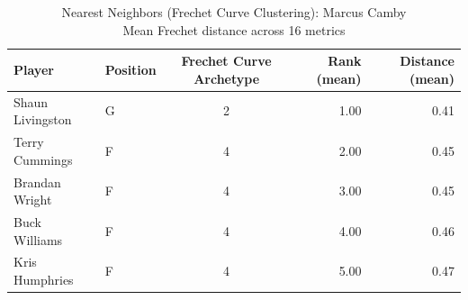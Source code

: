 \begin{table}[t]
\caption*{
{\fontsize{20}{25} Nearest Neighbors (Frechet Curve Clustering): Marcus Camby\fontsize{12}{15}\selectfont } \\ 
{\fontsize{14}{17}\selectfont  Mean Frechet distance across 16 metrics\fontsize{12}{15}\selectfont }
} 
\fontsize{12.0pt}{14.0pt}\selectfont
\begin{tabular*}{\linewidth}{@{\extracolsep{\fill}}llcrr}
\toprule
Player & Position & Frechet Curve Archetype & Rank (mean) & Distance (mean) \\ 
\midrule\addlinespace[2.5pt]
Shaun Livingston & G & 2 & 1.00 & 0.41 \\ 
Terry Cummings & F & 4 & 2.00 & 0.45 \\ 
Brandan Wright & F & 4 & 3.00 & 0.45 \\ 
Buck Williams & F & 4 & 4.00 & 0.46 \\ 
Kris Humphries & F & 4 & 5.00 & 0.47 \\ 
\bottomrule
\end{tabular*}
\end{table}

